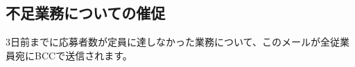 \documentclass[11pt, a4paper]{jarticle}
\begin{document}
	\subsection{不足業務についての催促}
		\begin{figure}[htbp]
			\centering
		\end{figure}
		3日前までに応募者数が定員に達しなかった業務について、このメールが全従業員宛にBCCで送信されます。
\end{document}
